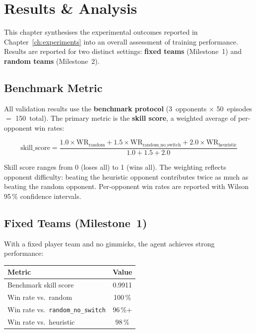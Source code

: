 \chapter{Results \& Analysis}
\label{ch:results}

This chapter synthesises the experimental outcomes reported in
Chapter~\ref{ch:experiments} into an overall assessment of training
performance.  Results are reported for two distinct settings: \textbf{fixed
teams} (Milestone~1) and \textbf{random teams} (Milestone~2).

\section{Benchmark Metric}

All validation results use the \textbf{benchmark protocol} (3~opponents
$\times$ 50~episodes $=$ 150~total).  The primary metric is the
\textbf{skill score}, a weighted average of per-opponent win rates:

\[
  \text{skill\_score} = \frac{
    1.0 \times \text{WR}_{\text{random}} +
    1.5 \times \text{WR}_{\text{random\_no\_switch}} +
    2.0 \times \text{WR}_{\text{heuristic}}
  }{1.0 + 1.5 + 2.0}
\]

Skill score ranges from 0 (loses all) to 1 (wins all).  The weighting
reflects opponent difficulty: beating the heuristic opponent contributes
twice as much as beating the random opponent.  Per-opponent win rates are
reported with Wilson 95\,\% confidence intervals.

\section{Fixed Teams (Milestone~1)}

With a fixed player team and no gimmicks, the agent achieves strong
performance:

\begin{center}
\small
\begin{tabularx}{0.8\textwidth}{l c}
  \toprule
  \textbf{Metric} & \textbf{Value} \\
  \midrule
  Benchmark skill score        & 0.9911 \\
  Win rate vs.\ random         & 100\,\% \\
  Win rate vs.\ \texttt{random\_no\_switch} & 96\,\%+ \\
  Win rate vs.\ heuristic      & 98\,\% \\
  \bottomrule
\end{tabularx}
\end{center}


